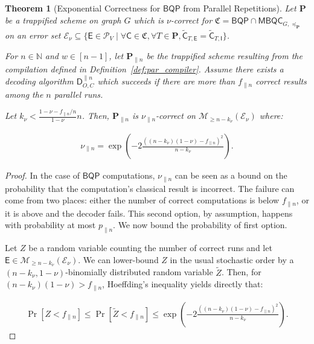 \documentclass[12pt]{iopart}
\newcommand{\cptp}[1]{\mathsf{#1}} \newcommand{\pd}[1]{\mathcal{#1}}  \newcommand{\sch}[1]{\bm{#1}}
\newcommand{\Id}{\cptp{I}}
\renewcommand{\1}{\mathds{1}}
\newcommand{\Deco}{\cptp D_{O, C}}
\newcommand{\Cdev}[1]{\tilde{\cptp C}_{T, #1}}
\newtheorem{theorem}{Theorem}
\begin{document}
\begin{theorem}[Exponential Correctness for $\mathsf{BQP}$ from Parallel Repetitions]\label{thm:par-boost-cor}
  Let $\sch P$ be a trappified scheme on graph $G$ which is $\nu$-correct for $\mathfrak{C} = \mathsf{BQP} \cap \mathsf{MBQC}_{G, \preceq_{\sch P}}$ on an error set $\mathcal{E}_\nu \subseteq \{\cptp E \in \mathcal{P}_V \mid \forall \cptp C \in \mathfrak{C}, \forall T \in \sch P, \Cdev{\cptp E} = \Cdev{\cptp \Id}\}$.
  
  For $n \in \mathbb{N}$ and $w \in [n-1]$, let $\sch P_{\parallel n}$ be the trappified scheme resulting from the compilation defined in Definition~\ref{def:par_compiler}.
  Assume there exists a decoding algorithm $\Deco^{\parallel n}$ which succeeds if there are more than $f_{\parallel n}$ correct results among the $n$ parallel runs.
  
  Let $k_\nu < \frac{1 - \nu - f_{\parallel n}/n}{1 - \nu}  n$. Then, $\sch P_{\parallel n}$ is $\nu_{\parallel n}$-correct on $\mathcal{M}_{\geq n - k_\nu}(\mathcal{E}_\nu)$ where:
  
  \begin{align}
  	\nu_{\parallel n} = \exp \left( -2 \frac{((n - k_\nu)(1 - \nu) - f_{\parallel n})^2}{n - k_\nu} \right).
  \end{align}
\end{theorem}

\begin{proof}
In the case of $\mathsf{BQP}$ computations, $\nu_{\parallel n}$ can be seen as a bound on the probability that the computation's classical result is incorrect. The failure can come from two places: either the number of correct computations is below $f_{\parallel n}$, or it is above and the decoder fails. This second option, by assumption, happens with probability at most $p_{\parallel n}$. We now bound the probability of first option.

Let $Z$ be a random variable counting the number of correct runs and let $\cptp E \in \mathcal{M}_{\geq n - k_\nu}(\mathcal{E}_\nu)$. We can lower-bound $Z$ in the usual stochastic order by a $(n - k_\nu, 1 - \nu)$-binomially distributed random variable $\tilde{Z}$. Then, for $(n - k_\nu)(1 - \nu) > f_{\parallel n}$, Hoeffding's inequality yields directly that:

\begin{align}
	\Pr[Z < f_{\parallel n}] \leq \Pr[\tilde{Z} < f_{\parallel n}] \leq \exp \left( -2 \frac{((n - k_\nu)(1 - \nu) - f_{\parallel n})^2}{n - k_\nu} \right).
\end{align} 

\end{proof}
\end{document}
